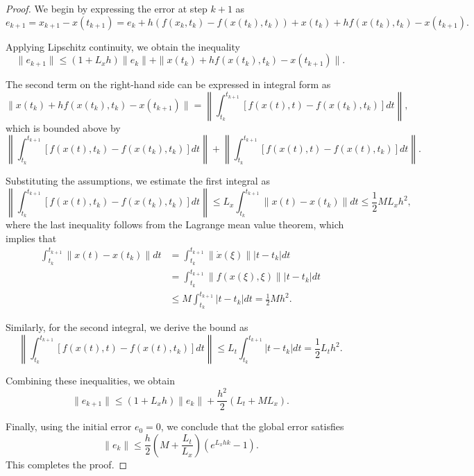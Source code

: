 \documentclass{article}
\begin{document}
\begin{proof}
    We begin by expressing the error at step $ k+1 $ as
    \[
    e_{k+1} = x_{k+1} - x(t_{k+1}) = e_k + h \left( f(x_k, t_k) - f(x(t_k), t_k) \right) + x(t_k) + h f(x(t_k), t_k) - x(t_{k+1}).
    \]

    Applying Lipschitz continuity, we obtain the inequality
    \[
    \|e_{k+1}\| \leq (1 + L_x h) \|e_k\| + \|x(t_k) + h f(x(t_k), t_k) - x(t_{k+1})\|.
    \]

    The second term on the right-hand side can be expressed in integral form as
    \[
    \|x(t_k) + h f(x(t_k), t_k) - x(t_{k+1})\| = \left\| \int_{t_k}^{t_{k+1}} \left[ f(x(t), t) - f(x(t_k), t_k) \right] dt \right\|,
    \]
    which is bounded above by
    \[
    \left\| \int_{t_k}^{t_{k+1}} \left[ f(x(t), t_k) - f(x(t_k), t_k) \right] dt \right\| + \left\| \int_{t_k}^{t_{k+1}} \left[ f(x(t), t) - f(x(t), t_k) \right] dt \right\|.
    \]

    Substituting the assumptions, we estimate the first integral as 
    \[
    \left\| \int_{t_k}^{t_{k+1}} \left[ f(x(t), t_k) - f(x(t_k), t_k) \right] dt \right\| \leq L_x \int_{t_k}^{t_{k+1}} \|x(t) - x(t_k)\| dt \leq \frac{1}{2} M L_x h^2,
    \]
    where the last inequality follows from the Lagrange mean value theorem, which implies that 
    \begin{align*}
    \int_{t_k}^{t_{k+1}} \|x(t) - x(t_k)\| dt 
    &= \int_{t_k}^{t_{k+1}} \|\dot{x}(\xi)\| |t - t_k| dt \\
    &= \int_{t_k}^{t_{k+1}} \|f(x(\xi), \xi)\| |t - t_k| dt \\
    &\leq M \int_{t_k}^{t_{k+1}} |t - t_k| dt = \frac{1}{2} M h^2.
    \end{align*}

    Similarly, for the second integral, we derive the bound as
    \[
    \left\| \int_{t_k}^{t_{k+1}} \left[ f(x(t), t) - f(x(t), t_k) \right] dt \right\| \leq L_t \int_{t_k}^{t_{k+1}} |t - t_k| dt = \frac{1}{2} L_t h^2.
    \]

    Combining these inequalities, we obtain
    \[
    \|e_{k+1}\| \leq (1 + L_x h) \|e_k\| + \frac{h^2}{2} (L_t + M L_x).
    \]

    Finally, using the initial error $ e_0 = 0 $, we conclude that the global error satisfies 
    \[
    \|e_k\| \leq \frac{h}{2} \left( M + \frac{L_t}{L_x} \right) \left( e^{L_x h k} - 1 \right).
    \]
    This completes the proof.
\end{proof}

\end{document}
